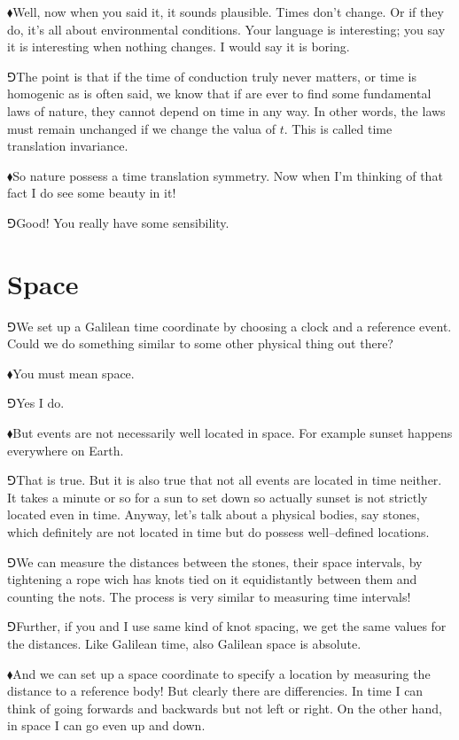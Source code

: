 \documentclass[10pt,oneside%
]{memoir}
\newcommand{\hea}{\(\blacklozenge\)\;}
\newcommand{\heb}{\(\Game\)\;}
\begin{document}
\hea Well, now when you said it, it sounds plausible. Times don't change. Or if they do, it's all about environmental conditions. Your language is interesting; you say it is interesting when nothing changes. I would say it is boring.

\heb The point is that if the time of conduction truly never matters, or time is homogenic as is often said, we know that if are ever to find some fundamental laws of nature, they cannot depend on time in any way. In other words, the laws must remain unchanged if we change the valua of \(t\). This is called time translation invariance.

\hea So nature possess a time translation symmetry. Now when I'm thinking of that fact I do see some beauty in it!

\heb Good! You really have some sensibility.
\section{Space}
\heb We set up a Galilean time coordinate by choosing a clock and a reference event. Could we do something similar to some other physical thing out there?

\hea You must mean space.

\heb Yes I do.

\hea But events are not necessarily well located in space. For example sunset happens everywhere on Earth.

\heb That is true. But it is also true that not all events are located in time neither. It takes a minute or so for a sun to set down so actually sunset is not strictly located even in time. Anyway, let's talk about a physical bodies, say stones, which definitely are not located in time but do possess well--defined locations.

\heb We can measure the distances between the stones, their space intervals, by tightening a rope wich has knots tied on it equidistantly between them and counting the nots. The process is very similar to measuring time intervals!

\heb Further, if you and I use same kind of knot spacing, we get the same values for the distances. Like Galilean time, also Galilean space is absolute. 

\hea And we can set up a space coordinate to specify a location by measuring the distance to a reference body! But clearly there are differencies. In time I can think of going forwards and backwards but not left or right. On the other hand, in space I can go even up and down.
\end{document}

